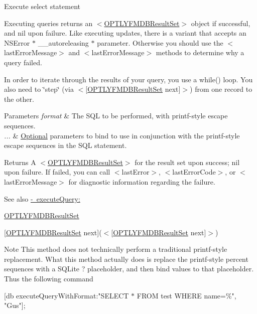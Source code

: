 Execute select statement

Executing queries returns an {\ttfamily $<$\mbox{\hyperlink{interface_o_p_t_l_y_f_m_d_b_result_set}{O\+P\+T\+L\+Y\+F\+M\+D\+B\+Result\+Set}}$>$} object if successful, and {\ttfamily nil} upon failure. Like executing updates, there is a variant that accepts an {\ttfamily N\+S\+Error $\ast$ \+\_\+\+\_\+autoreleasing $\ast$} parameter. Otherwise you should use the {\ttfamily $<$last\+Error\+Message$>$} and {\ttfamily $<$last\+Error\+Message$>$} methods to determine why a query failed.

In order to iterate through the results of your query, you use a {\ttfamily while()} loop. You also need to \char`\"{}step\char`\"{} (via {\ttfamily $<$\mbox{[}\mbox{\hyperlink{interface_o_p_t_l_y_f_m_d_b_result_set}{O\+P\+T\+L\+Y\+F\+M\+D\+B\+Result\+Set}} next\mbox{]}$>$}) from one record to the other.


\begin{DoxyParams}{Parameters}
{\em format} & The S\+QL to be performed, with {\ttfamily printf}-\/style escape sequences.\\
\hline
{\em ...} & \mbox{\hyperlink{protocol_optional-p}{Optional}} parameters to bind to use in conjunction with the {\ttfamily printf}-\/style escape sequences in the S\+QL statement.\\
\hline
\end{DoxyParams}
\begin{DoxyReturn}{Returns}
A {\ttfamily $<$\mbox{\hyperlink{interface_o_p_t_l_y_f_m_d_b_result_set}{O\+P\+T\+L\+Y\+F\+M\+D\+B\+Result\+Set}}$>$} for the result set upon success; {\ttfamily nil} upon failure. If failed, you can call {\ttfamily $<$last\+Error$>$}, {\ttfamily $<$last\+Error\+Code$>$}, or {\ttfamily $<$last\+Error\+Message$>$} for diagnostic information regarding the failure.
\end{DoxyReturn}
\begin{DoxySeeAlso}{See also}
\mbox{\hyperlink{interface_o_p_t_l_y_f_m_d_b_database_ad749b1bd0f19dc48b36867d1622d201a}{-\/ execute\+Query\+:}} 

\mbox{\hyperlink{interface_o_p_t_l_y_f_m_d_b_result_set}{O\+P\+T\+L\+Y\+F\+M\+D\+B\+Result\+Set}} 

\mbox{[}{\ttfamily \mbox{\hyperlink{interface_o_p_t_l_y_f_m_d_b_result_set}{O\+P\+T\+L\+Y\+F\+M\+D\+B\+Result\+Set}} next}\mbox{]}($<$\mbox{[}\mbox{\hyperlink{interface_o_p_t_l_y_f_m_d_b_result_set}{O\+P\+T\+L\+Y\+F\+M\+D\+B\+Result\+Set}} next\mbox{]}$>$)
\end{DoxySeeAlso}
\begin{DoxyNote}{Note}
This method does not technically perform a traditional printf-\/style replacement. What this method actually does is replace the printf-\/style percent sequences with a S\+Q\+Lite {\ttfamily ?} placeholder, and then bind values to that placeholder. Thus the following command
\end{DoxyNote}
\mbox{[}db execute\+Query\+With\+Format\+:"S\+E\+L\+E\+CT $\ast$ F\+R\+OM test W\+H\+E\+RE name=\%", "Gus"\mbox{]};

